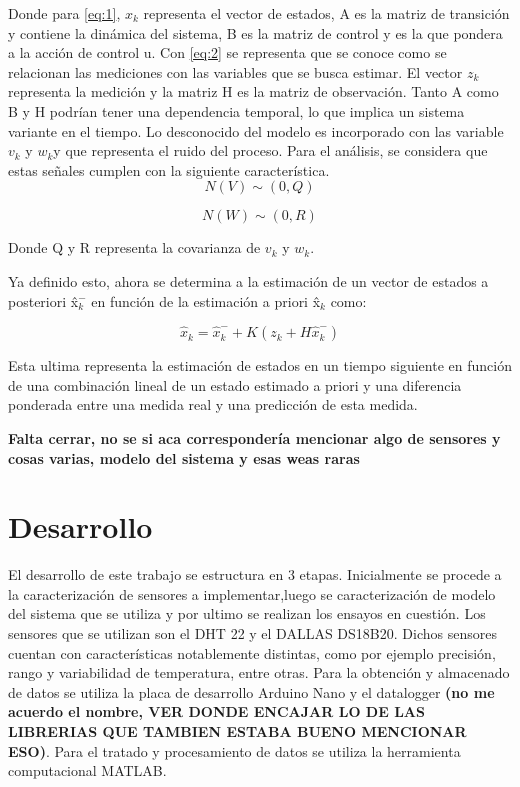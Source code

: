 \documentclass[journal]{IEEEtran}
\begin{document}
Donde para \ref{eq:1}, $x_{k}$ representa el vector de estados, A es la matriz de transición y contiene la dinámica del sistema, B es la matriz de control y es la que pondera a la acción de control u. Con \ref{eq:2} se representa que se conoce como se relacionan las mediciones con las variables que se busca estimar. El vector $z_{k}$ representa la medición y la matriz H es la matriz de observación. Tanto A como B y H podrían tener una dependencia temporal, lo que implica un sistema variante en el tiempo.
 Lo desconocido del modelo es incorporado con las variable $v_{k}$ y $w_{k}$y  que representa el ruido del proceso. Para el análisis, se considera que estas señales cumplen con la siguiente característica.
 \begin{equation}
 N(V)\sim(0,Q)
 \label{eq:3}
 \end{equation}


 \begin{equation}
 N(W)\sim(0,R)
  \label{eq:4}
 \end{equation}
 
 Donde Q y R representa la covarianza de $v_{k}$ y $w_{k}$.

Ya definido esto, ahora se determina a la estimación de un vector de estados a posteriori \^{x$_k^-$} en función de la estimación a priori \^{x$_k$} como:

 \begin{equation}
\hat{x}_k=\hat{x}_k^-+K(z_k+H\hat{x}_k^-)
  \label{eq:5}
 \end{equation}

Esta ultima representa la estimación de estados en un tiempo siguiente en función de una combinación lineal de un estado estimado a priori y una diferencia ponderada entre una medida real y una predicción de esta medida. 

\textbf{Falta cerrar, no se si aca correspondería mencionar algo de sensores y cosas varias, modelo del sistema y esas weas raras}\\


\section{Desarrollo}
El desarrollo de este trabajo se estructura en 3 etapas. Inicialmente se procede a la caracterización de sensores a implementar,luego se caracterización de modelo del sistema que se utiliza y por ultimo se realizan los ensayos en cuestión. 
Los sensores que se utilizan son el DHT 22 y el DALLAS DS18B20. Dichos sensores cuentan con características notablemente distintas, como por ejemplo precisión, rango y variabilidad de temperatura, entre otras. 
Para la obtención y almacenado de datos se utiliza la placa de desarrollo Arduino Nano y el datalogger \textbf{(no me acuerdo el nombre, VER DONDE ENCAJAR LO DE LAS LIBRERIAS QUE TAMBIEN ESTABA BUENO MENCIONAR ESO)}. Para el tratado y procesamiento de datos se utiliza la herramienta computacional MATLAB.
\end{document}
